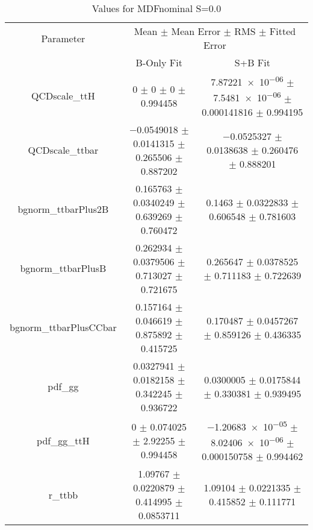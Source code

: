 \begin{table}
\centering
\caption{Values for MDFnominal S=0.0}
\begin{tabular}{ccc}
\toprule
Parameter & \multicolumn{2}{c}{Mean $\pm$ Mean Error $\pm$ RMS $\pm$ Fitted Error}\\
 & B-Only Fit & S+B Fit\\
\midrule
QCDscale\_ttH & \num{0} $\pm$ \num{0} $\pm$ \num{0} $\pm$ \num{0.994458} & \num{7.87221e-06} $\pm$ \num{7.5481e-06} $\pm$ \num{0.000141816} $\pm$ \num{0.994195}\\
QCDscale\_ttbar & \num{-0.0549018} $\pm$ \num{0.0141315} $\pm$ \num{0.265506} $\pm$ \num{0.887202} & \num{-0.0525327} $\pm$ \num{0.0138638} $\pm$ \num{0.260476} $\pm$ \num{0.888201}\\
bgnorm\_ttbarPlus2B & \num{0.165763} $\pm$ \num{0.0340249} $\pm$ \num{0.639269} $\pm$ \num{0.760472} & \num{0.1463} $\pm$ \num{0.0322833} $\pm$ \num{0.606548} $\pm$ \num{0.781603}\\
bgnorm\_ttbarPlusB & \num{0.262934} $\pm$ \num{0.0379506} $\pm$ \num{0.713027} $\pm$ \num{0.721675} & \num{0.265647} $\pm$ \num{0.0378525} $\pm$ \num{0.711183} $\pm$ \num{0.722639}\\
bgnorm\_ttbarPlusCCbar & \num{0.157164} $\pm$ \num{0.046619} $\pm$ \num{0.875892} $\pm$ \num{0.415725} & \num{0.170487} $\pm$ \num{0.0457267} $\pm$ \num{0.859126} $\pm$ \num{0.436335}\\
pdf\_gg & \num{0.0327941} $\pm$ \num{0.0182158} $\pm$ \num{0.342245} $\pm$ \num{0.936722} & \num{0.0300005} $\pm$ \num{0.0175844} $\pm$ \num{0.330381} $\pm$ \num{0.939495}\\
pdf\_gg\_ttH & \num{0} $\pm$ \num{0.074025} $\pm$ \num{2.92255} $\pm$ \num{0.994458} & \num{-1.20683e-05} $\pm$ \num{8.02406e-06} $\pm$ \num{0.000150758} $\pm$ \num{0.994462}\\
r\_ttbb & \num{1.09767} $\pm$ \num{0.0220879} $\pm$ \num{0.414995} $\pm$ \num{0.0853711} & \num{1.09104} $\pm$ \num{0.0221335} $\pm$ \num{0.415852} $\pm$ \num{0.111771}\\
\bottomrule
\end{tabular}
\end{table}